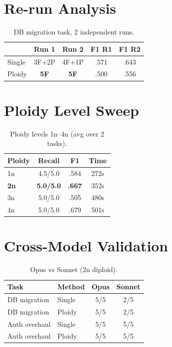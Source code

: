 \documentclass{article}
\begin{document}
\section{Re-run Analysis}
\begin{table}[H]
\centering
\caption{DB migration task, 2 independent runs.}
\small
\begin{tabular}{@{}lcccc@{}}
\toprule
& \textbf{Run 1} & \textbf{Run 2} & \textbf{F1 R1} & \textbf{F1 R2} \\
\midrule
Single & 3F+2P & 4F+1P & .571 & .643 \\
Ploidy & \textbf{5F} & \textbf{5F} & .500 & .556 \\
\bottomrule
\end{tabular}
\end{table}

\section{Ploidy Level Sweep}
\begin{table}[H]
\centering
\caption{Ploidy levels 1n--4n (avg over 2 tasks).}
\small
\begin{tabular}{@{}lccc@{}}
\toprule
\textbf{Ploidy} & \textbf{Recall} & \textbf{F1} & \textbf{Time} \\
\midrule
1n & 4.5/5.0 & .584 & 272s \\
\textbf{2n} & \textbf{5.0/5.0} & \textbf{.667} & 352s \\
3n & 5.0/5.0 & .505 & 480s \\
4n & 5.0/5.0 & .679 & 501s \\
\bottomrule
\end{tabular}
\end{table}

\section{Cross-Model Validation}
\begin{table}[H]
\centering
\caption{Opus vs Sonnet (2n diploid).}
\small
\begin{tabular}{@{}llcc@{}}
\toprule
\textbf{Task} & \textbf{Method} & \textbf{Opus} & \textbf{Sonnet} \\
\midrule
DB migration & Single & 5/5 & 2/5 \\
DB migration & Ploidy & 5/5 & 2/5 \\
Auth overhaul & Single & 5/5 & 5/5 \\
Auth overhaul & Ploidy & 5/5 & 5/5 \\
\bottomrule
\end{tabular}
\end{table}
\end{document}

